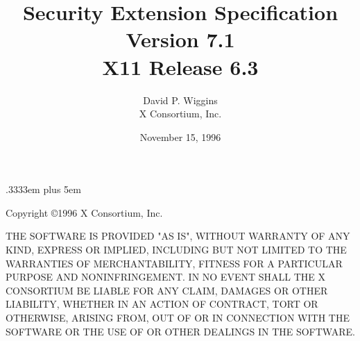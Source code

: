 \newenvironment{eerror}[1]{\begin{keeptogether} \encodingsection{#1} \begin{tabbing} \etabstops }{\end{tabbing} \end{keeptogether}}

\newenvironment{etypedef}[1]{\begin{keeptogether} \typename{#1} \begin{tabbing} \etabstops }{\end{tabbing} \end{keeptogether}}

\newcommand{\cfunctionname}[1]{\mbox{\tt #1}}
\newcommand{\cfunctiondecl}[1]{\mbox{\rm #1}}
\newcommand{\cargdecl}[2]{\penalty -1\typename{#1} \argname{#2}}
\newenvironment{cfunction}[2]{\begin{sloppypar}\begin{keeptogether}\vspace{5mm}\typename{#1}\\ \cfunctiondecl{#2}\ (}{)\end{keeptogether}\end{sloppypar}{\hangafter=2 \hangindent=20pt \raggedright\par}}

\spaceskip .3333em plus 5em



\title{Security Extension Specification\\Version 7.1\\X11 Release 6.3}
\author{David P. Wiggins\\X Consortium, Inc.}
\date{November 15, 1996}
\maketitle
\thispagestyle{empty}

\eject

Copyright \copyright 1996 X Consortium, Inc.

THE SOFTWARE IS PROVIDED "AS IS", WITHOUT WARRANTY OF ANY KIND,
EXPRESS OR IMPLIED, INCLUDING BUT NOT LIMITED TO THE WARRANTIES OF
MERCHANTABILITY, FITNESS FOR A PARTICULAR PURPOSE AND NONINFRINGEMENT.
IN NO EVENT SHALL THE X CONSORTIUM BE LIABLE FOR ANY CLAIM, DAMAGES OR
OTHER LIABILITY, WHETHER IN AN ACTION OF CONTRACT, TORT OR OTHERWISE,
ARISING FROM, OUT OF OR IN CONNECTION WITH THE SOFTWARE OR THE USE OF
OR OTHER DEALINGS IN THE SOFTWARE.

